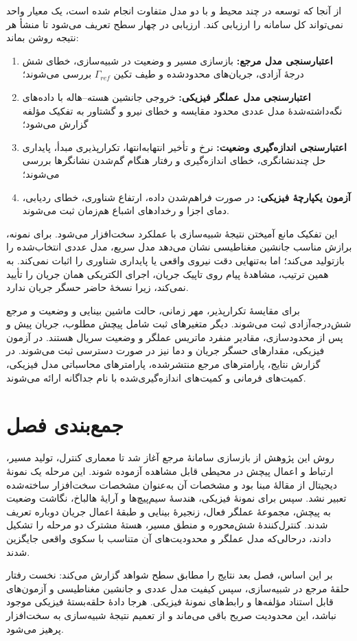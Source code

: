 از آنجا که توسعه در چند محیط و با دو مدل متفاوت انجام شده است، یک معیار واحد نمی‌تواند کل سامانه را ارزیابی کند. ارزیابی در چهار سطح تعریف می‌شود تا منشأ هر نتیجه روشن بماند:

\begin{enumerate}
	\item \textbf{اعتبارسنجی مدل مرجع:} بازسازی مسیر و وضعیت در شبیه‌سازی، خطای شش درجهٔ آزادی، جریان‌های محدودشده و طیف تکین $\Gamma_{ref}$ بررسی می‌شوند؛
	\item \textbf{اعتبارسنجی مدل عملگر فیزیکی:} خروجی جانشین هسته--هاله با داده‌های نگه‌داشته‌شدهٔ مدل عددی محدود مقایسه و خطای نیرو و گشتاور به تفکیک مؤلفه گزارش می‌شود؛
	\item \textbf{اعتبارسنجی اندازه‌گیری وضعیت:} نرخ و تأخیر انتهابه‌انتها، تکرارپذیری مبدأ، پایداری حل چندنشانگری، خطای اندازه‌گیری و رفتار هنگام گم‌شدن نشانگرها بررسی می‌شوند؛
	\item \textbf{آزمون یکپارچهٔ فیزیکی:} در صورت فراهم‌شدن داده، ارتفاع شناوری، خطای ردیابی، دمای اجزا و رخدادهای اشباع هم‌زمان ثبت می‌شوند.
\end{enumerate}

این تفکیک مانع آمیختن نتیجهٔ شبیه‌سازی با عملکرد سخت‌افزار می‌شود. برای نمونه، برازش مناسب جانشین مغناطیسی نشان می‌دهد مدل سریع، مدل عددی انتخاب‌شده را بازتولید می‌کند؛ اما به‌تنهایی دقت نیروی واقعی یا پایداری شناوری را اثبات نمی‌کند. به همین ترتیب، مشاهدهٔ پیام روی تاپیک جریان، اجرای الکتریکی همان جریان را تأیید نمی‌کند، زیرا نسخهٔ حاضر حسگر جریان ندارد.

برای مقایسهٔ تکرارپذیر، مهر زمانی، حالت ماشین بینایی و وضعیت و مرجع شش‌درجه‌آزادی ثبت می‌شوند. دیگر متغیرهای ثبت شامل پیچش مطلوب، جریان پیش و پس از محدودسازی، مقادیر منفرد ماتریس عملگر و وضعیت سریال هستند. در آزمون فیزیکی، مقدارهای حسگر جریان و دما نیز در صورت دسترسی ثبت می‌شوند. در گزارش نتایج، پارامترهای مرجع منتشرشده، پارامترهای محاسباتی مدل فیزیکی، کمیت‌های فرمانی و کمیت‌های اندازه‌گیری‌شده با نام جداگانه ارائه می‌شوند.

\section{جمع‌بندی فصل}
\label{sec:method-summary}

روش این پژوهش از بازسازی سامانهٔ مرجع آغاز شد تا معماری کنترل، تولید مسیر، ارتباط  و اعمال پیچش در محیطی قابل مشاهده آزموده شوند. این مرحله یک نمونهٔ دیجیتال از مقالهٔ مبنا بود و مشخصات آن به‌عنوان مشخصات سخت‌افزار ساخته‌شده تعبیر نشد. سپس برای نمونهٔ فیزیکی، هندسهٔ سیم‌پیچ‌ها و آرایهٔ هالباخ، نگاشت وضعیت به پیچش، مجموعهٔ عملگر فعال، زنجیرهٔ بینایی و طبقهٔ اعمال جریان دوباره تعریف شدند. کنترل‌کنندهٔ شش‌محوره و منطق مسیر، هستهٔ مشترک دو مرحله را تشکیل دادند، درحالی‌که مدل عملگر و محدودیت‌های آن متناسب با سکوی واقعی جایگزین شدند.

بر این اساس، فصل بعد نتایج را مطابق سطح شواهد گزارش می‌کند: نخست رفتار حلقهٔ مرجع در شبیه‌سازی، سپس کیفیت مدل عددی و جانشین مغناطیسی و آزمون‌های قابل استناد مؤلفه‌ها و رابط‌های نمونهٔ فیزیکی. هرجا دادهٔ حلقه‌بستهٔ فیزیکی موجود نباشد، این محدودیت صریح باقی می‌ماند و از تعمیم نتیجهٔ شبیه‌سازی به سخت‌افزار پرهیز می‌شود.
